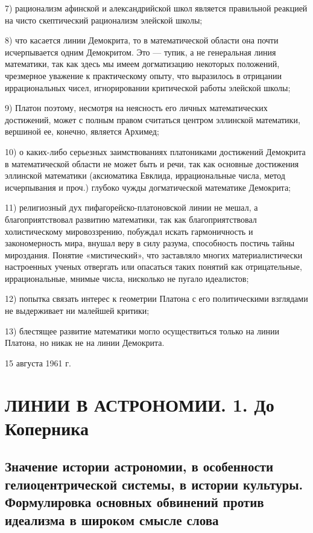 7)  рационализм афинской  и александрийской  школ является  правильной
реакцией на чисто скептический рационализм элейской школы;

8) что касается линии Демокрита, то в математической области она почти
исчерпывается одним Демокритом. Это ---  тупик, а не генеральная линия
математики, так  как здесь мы имеем  догматизацию некоторых положений,
чрезмерное уважение к практическому  опыту, что выразилось в отрицании
иррациональных чисел, игнорировании критической работы элейской школы;

9)  Платон поэтому,  несмотря на  неясность его  личных математических
достижений,  может   с  полным  правом  считаться   центром  эллинской
математики, вершиной ее, конечно, является Архимед;

10)  о  каких-либо  серьезных  заимствованиях  платониками  достижений
Демокрита  в  математической  области  не   может  быть  и  речи,  так
как  основные достижения  эллинской  математики (аксиоматика  Евклида,
иррациональные  числа,  метод  исчерпывания  и  проч.)  глубоко  чужды
догматической математике Демокрита;

11)  религиозный  дух  пифагорейско-платоновской  линии  не  мешал,  а
благоприятствовал  развитию  математики,   так  как  благоприятствовал
холистическому   мировоззрению,   побуждал  искать   гармоничность   и
закономерность мира,  внушал веру  в силу разума,  способность постичь
тайны  мироздания.   Понятие  «мистический»,  что   заставляло  многих
материалистически  настроенных ученых  отвергать  или опасаться  таких
понятий как отрицательные, иррациональные,  мнимые числа, нисколько не
пугало идеалистов;

12) попытка  связать интерес к  геометрии Платона с  его политическими
взглядами не выдерживает ни малейшей критики;

13) блестящее развитие математики  могло осуществиться только на линии
Платона, но никак не на линии Демокрита.

\begin{flushright} 15 августа 1961 г. \end{flushright}

\clearpage

\section{ЛИНИИ В АСТРОНОМИИ. 1. До Коперника}

\subsection{Значение     истории     астрономии,     в     особенности
гелиоцентрической системы,  в истории культуры.  Формулировка основных
обвинений против идеализма в широком смысле слова}

